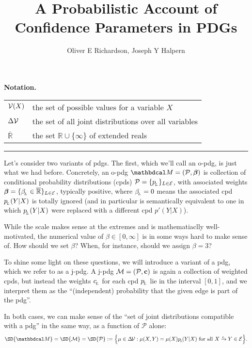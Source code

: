 \documentclass{article}
\title{A Probabilistic Account of Confidence Parameters in PDGs}
\author{Oliver E Richardson, Joseph Y Halpern}
\begin{document}
\maketitle


\textbf{Notation.}

\begin{tabular}{ll}
    $\mathcal V(X)$ & the set of possible values for a variable $X$ \\
    $\Delta \mathcal V$ & the set of all joint distributions over all variables \\
    $\overline{\mathbb R}$ & the set
        $ \mathbb R \cup \{\infty\}$ of extended reals
\end{tabular}

\smallskip \hrule\smallskip

Let's consider two variants of pdgs. The first, which we'll call an o-pdg, is just what we had before. 
Concretely, an o-pdg $\dg M = (\mathcal P, \bbeta)$ is collection of conditional probability distributions (cpds) $\mathcal P = \{p_{\!_{L}} \}_{L \in \mathcal E}$, with associated weights $\boldsymbol\beta = \{\beta_{\!_{L}} \in \overline{\mathbb R}\}_{L \in \mathcal E}$, typically positive, where $\beta_{\!_{L}}=0$ means the associated cpd $p_{\!_{L}}(Y|X)$ is totally ignored (and in particular is semantically equivalent to one in which $p_{\!_{L}}(Y|X)$ were replaced with a different cpd $p'(Y|X)$). 

While the scale makes sense at the extremes and is mathematiaclly well-motivated, the numerical value of $\beta \in [0,\infty]$ is in some ways hard to make sense of. 
How should we set $\beta$?  When, for instance, should we assign $\beta = 3$?

To shine some light on these questions, we will introduce a variant of a pdg, which we refer to as a j-pdg. A j-pdg $\mathcal M = (\mathcal P, \mathbf{c})$ is again a collection of weighted cpds, but instead the weights $c _{\!_{L}}$ for each cpd $p_{\!_{L}}$ lie in the interval $[0,1]$, and we interpret them as the ``(independent) probability that the given edge is part of the pdg''.

In both cases, we can make sense of the ``set of joint distributions compatible with a pdg'' in the same way, as a function of $\mathcal P$ alone: 
\[
    \SD{\dg M} = \SD{\mathcal M} = \SD{\mathcal P} 
        := \Big\{ \mu \in \Delta\! \V : \mu(X,Y) = \mu(X)p\ssub L\!(Y|X) \text{ for all } 
            \ed LXY  \in \Ed \Big\}.
\]
\end{document}
